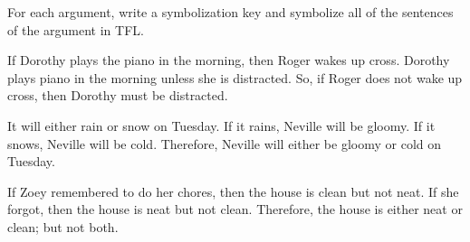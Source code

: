 \problempart
For each argument, write a symbolization key and symbolize all of the sentences of the argument in TFL.
\begin{earg}
\item If Dorothy plays the piano in the morning, then Roger wakes up cross. Dorothy plays piano in the morning unless she is distracted. So, if Roger does not wake up cross, then Dorothy must be distracted.
\item[] 
\bigskip

\item It will either rain or snow on Tuesday. If it rains, Neville will be gloomy. If it snows, Neville will be cold. Therefore, Neville will either be gloomy or cold on Tuesday.
\item[] 
\bigskip

\item If Zoey remembered to do her chores, then the house is clean but not neat. If she forgot, then the house is neat but not clean. Therefore, the house is either neat or clean; but not both.
\item[] 
\end{earg}



